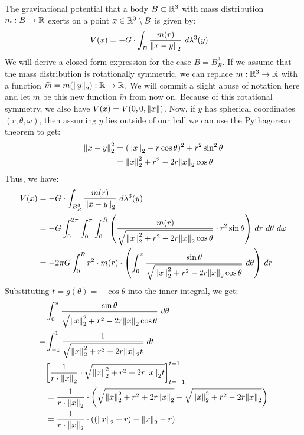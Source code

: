 \begin{example}
	The gravitational potential that a body $B \subset \mathbb{R}^3$ with mass distribution $m : B \to \mathbb{R}$ exerts on a point $x \in \mathbb{R}^3 \setminus B$ is given by:
	\begin{align*}
		V(x) &= -G \cdot \int_{B} \frac{m(r)}{\norm{x - y}_2} ~d\lambda^3(y)
	\end{align*}
	We will derive a closed form expression for the case $B = B_R^3$.
	If we assume that the mass distribution is rotationally symmetric, we can replace $m : \mathbb{R}^3 \to \mathbb{R}$ with a function $\widetilde m = m(\norm{y}_2): \mathbb{R} \to \mathbb{R}$. We will commit a slight abuse of notation here and let $m$ be this new function $\tilde m$ from now on. Because of this rotational symmetry, we also have $V(x) = V(0,0,\norm{x})$.
	\newpar
	Now, if $y$ has spherical coordinates $(r, \theta, \omega)$, then assuming $y$ lies outside of our ball we can use the Pythagorean theorem to get:
	\begin{align*}
		\norm{x-y}_2^2 
		&= (\norm{x}_2 - r \cos \theta)^2 + r^2 \sin^2 \theta\\
		& = \norm{x}_2^2 + r^2 - 2r \norm{x}_2 \cos \theta
	\end{align*}
	Thus, we have:
	\begin{align*}
		V(x) 
		&= -G \cdot \int_{B_R^3} \frac{m(r)}{\norm{x - y}_2} ~d\lambda^3(y)\\
		&= -G \int_0^{2\pi} \int_0^\pi \int_0^R \qty(\frac{m(r)}{\sqrt{\norm{x}_2^2 + r^2 - 2r \norm{x}_2 \cos \theta}} \cdot r^2 \sin \theta) ~dr ~d\theta ~d\omega\\
		&= -2\pi G \int_0^R r^2 \cdot m(r) \cdot \qty(\int_0^\pi \frac{\sin \theta}{\sqrt{\norm{x}_2^2 + r^2 - 2r \norm{x}_2 \cos \theta}} ~d\theta) ~dr
	\end{align*}
	Substituting $t = g(\theta) = -\cos \theta$ into the inner integral, we get:
	\begin{align*}
		&\int_0^\pi \frac{\sin \theta}{\sqrt{\norm{x}_2^2 + r^2 - 2r \norm{x}_2 \cos \theta}} ~d\theta\\
		=
		&\int_{-1}^1 \frac{1}{\sqrt{\norm{x}_2^2 + r^2 + 2r \norm{x}_2t}} ~dt\\
		=
		&\lr[\frac{1}{r \cdot \norm{x}_2} \cdot \sqrt{\norm{x}_2^2 + r^2 + 2r \norm{x}_2t}]^{t = 1}_{t = -1}\\
		&= \frac{1}{r \cdot \norm{x}_2} \cdot \lr(\sqrt{\norm{x}_2^2 + r^2 + 2r \norm{x}_2}
		- \sqrt{\norm{x}_2^2 + r^2 - 2r \norm{x}_2})\\
		&= \frac{1}{r \cdot \norm{x}_2} \cdot ((\norm{x}_2 + r) - \norm{x}_2 - r)\\

\end{align*}
\end{example}
